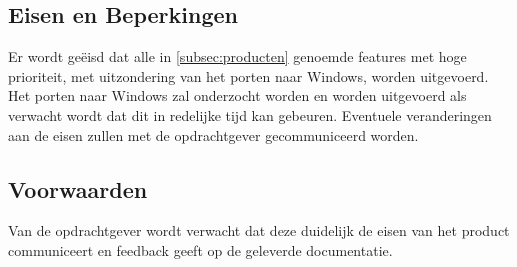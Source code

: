 \subsection{Eisen en Beperkingen}
Er wordt ge\"eisd dat alle in \ref{subsec:producten} genoemde features met hoge prioriteit, met uitzondering van het porten naar Windows, worden uitgevoerd. Het porten naar Windows zal onderzocht worden en worden uitgevoerd als verwacht wordt dat dit in redelijke tijd kan gebeuren. Eventuele veranderingen aan de eisen zullen met de opdrachtgever gecommuniceerd worden.

\subsection{Voorwaarden}
Van de opdrachtgever wordt verwacht dat deze duidelijk de eisen van het product communiceert en feedback geeft op de geleverde documentatie.  
